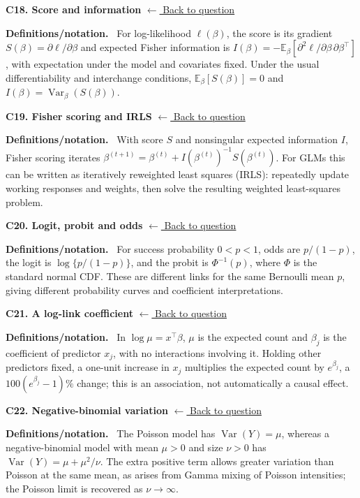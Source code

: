 \documentclass[11pt,a4paper]{article}
\newcommand{\E}{\mathbb{E}}
\newcommand{\concepttopic}[1]{%
  \par\addvspace{8pt}\noindent{\color{statblue}\bfseries #1}\par\nobreak\smallskip}
\newenvironment{conceptanswer}[2]
  {\par\addvspace{10pt}\noindent\begin{minipage}{\linewidth}%
   \hypertarget{concept-answer:#1}{}%
   \textcolor{statblue}{\textbf{C#1. #2}}\hfill%
   {\footnotesize\hyperlink{concept-question:#1}{$\leftarrow$ Back to question}}%
   \par\smallskip\textbf{Definitions/notation.}\ }
  {\end{minipage}\par}
\begin{document}
\begin{conceptanswer}{18}{Score and information}
For log-likelihood $\ell(\beta)$, the score is its gradient
$S(\beta)=\partial\ell/\partial\beta$ and expected Fisher information is
$I(\beta)=-\E_\beta[\partial^2\ell/\partial\beta\,\partial\beta^\top]$,
with expectation under the model and covariates fixed.
Under the usual differentiability and interchange conditions,
$\E_\beta[S(\beta)]=0$ and $I(\beta)=\operatorname{Var}_\beta(S(\beta))$.
\end{conceptanswer}

\begin{conceptanswer}{19}{Fisher scoring and IRLS}
With score $S$ and nonsingular expected information $I$, Fisher scoring
iterates $\beta^{(t+1)}=\beta^{(t)}+
I(\beta^{(t)})^{-1}S(\beta^{(t)})$.
For GLMs this can be written as iteratively reweighted least squares
(IRLS): repeatedly update working responses and weights, then solve the
resulting weighted least-squares problem.
\end{conceptanswer}

\concepttopic{Response families and interpretation}
\begin{conceptanswer}{20}{Logit, probit and odds}
For success probability $0<p<1$, odds are $p/(1-p)$, the logit is
$\log\{p/(1-p)\}$, and the probit is $\Phi^{-1}(p)$, where $\Phi$ is the
standard normal CDF.
These are different links for the same Bernoulli mean $p$, giving
different probability curves and coefficient interpretations.
\end{conceptanswer}

\begin{conceptanswer}{21}{A log-link coefficient}
In $\log\mu=x^\top\beta$, $\mu$ is the expected count and $\beta_j$ is
the coefficient of predictor $x_j$, with no interactions involving it.
Holding other predictors fixed, a one-unit increase in $x_j$ multiplies
the expected count by $e^{\beta_j}$, a
$100(e^{\beta_j}-1)\%$ change; this is an association, not automatically
a causal effect.
\end{conceptanswer}

\begin{conceptanswer}{22}{Negative-binomial variation}
The Poisson model has $\operatorname{Var}(Y)=\mu$, whereas a
negative-binomial model with mean $\mu>0$ and size $\nu>0$ has
$\operatorname{Var}(Y)=\mu+\mu^2/\nu$.
The extra positive term allows greater variation than Poisson at the
same mean, as arises from Gamma mixing of Poisson intensities;
the Poisson limit is recovered as $\nu\to\infty$.
\end{conceptanswer}
\end{document}
